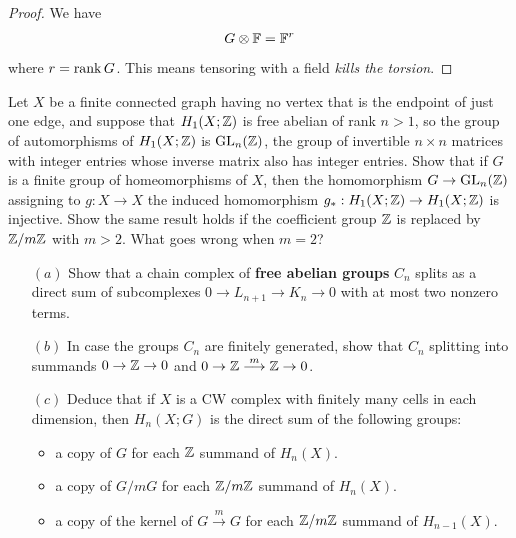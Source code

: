 \begin{proof}
We have 
\[G\otimes\mathbb{F}=\mathbb{F}^r\]
where $r=\mathrm{rank}\, G$. This means tensoring with a field \textit{kills the torsion}.
\end{proof}
\begin{exercise}
Let $X$ be a finite connected graph having no vertex that is the endpoint of just one edge, and suppose that $H_1(X;\mathbb{Z})$ is free abelian of rank $n>1$, so the group of automorphisms of $H_1(X;\mathbb{Z})$ is $\mathrm{GL}_n(\mathbb{Z})$, the group of invertible $n\times n$ matrices with integer entries whose inverse matrix also has integer entries. Show that if $G$ is a finite group of homeomorphisms of $X$, then the homomorphism $G\to\mathrm{GL}_n(\mathbb{Z})$ assigning to $g:X\to X$ the induced homomorphism $g_*:H_1(X;\mathbb{Z})\to H_1(X;\mathbb{Z})$ is injective. Show the same result holds if the coefficient group $\mathbb{Z}$ is replaced by $\mathbb{Z}/m\mathbb{Z}$ with $m>2$. What goes wrong when $m=2$?
\end{exercise}
\begin{exercise}\label{homology structure}
\mbox{}
\begin{itemize}
\item[$(a)$]Show that a chain complex of \textbf{free abelian groups} $C_n$ splits as a direct sum of subcomplexes $0\to L_{n+1}\to K_n\to 0$ with at most two nonzero terms.
\item[$(b)$]In case the groups $C_n$ are finitely generated, show that $C_n$ splitting into summands $0\to\mathbb{Z}\to0$ and $0\to\mathbb{Z}\stackrel{m}{\longrightarrow}\mathbb{Z}\to0$.
\item[$(c)$]Deduce that if $X$ is a CW complex with finitely many cells in each dimension, then $H_n(X;G)$ is the direct sum of the following groups:
\begin{itemize}
\item a copy of $G$ for each $\mathbb{Z}$ summand of $H_n(X)$.
\item a copy of $G/mG$ for each $\mathbb{Z}/m\mathbb{Z}$ summand of $H_n(X)$.
\item a copy of the kernel of $G\stackrel{m}{\longrightarrow}G$ for each $\mathbb{Z}/m\mathbb{Z}$ summand of $H_{n-1}(X)$.
\end{itemize}
\end{itemize}
\end{exercise}
